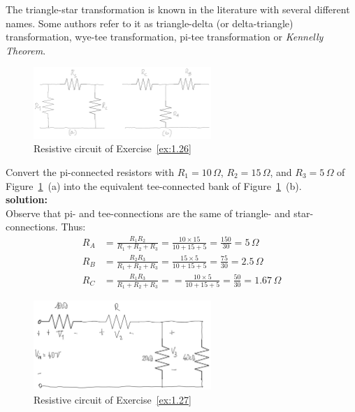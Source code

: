 \begin{remark}
The triangle-star transformation is known in the literature with several different names. Some authors refer to it as triangle-delta (or delta-triangle) transformation, wye-tee transformation, pi-tee transformation or \emph{Kennelly Theorem}.
\end{remark}

\begin{figure}[h!]
  \centering
  \includegraphics[width=0.6\textwidth]{"images/Fig-05"}
  \caption{Resistive circuit of Exercise~\ref{ex:1.26}} 
  \label{Fig:Ex:1.26}
\end{figure}

\begin{exercise}
\label{ex:1.26}
Convert the pi-connected resistors with $R_1=10\,\Omega$, $R_2=15\,\Omega$, and $R_3=5\,\Omega$ of Figure~\ref{Fig:Ex:1.26}~(a) into the equivalent tee-connected bank of Figure~\ref{Fig:Ex:1.26}~(b).\\

\textbf{solution:}\\ 
Observe that pi- and tee-connections are the same of triangle- and star-connections. Thus:
\begin{equation*}
\begin{split}
R_A &= \frac{R_1R_2}{R_1 + R_2 + R_3} = \frac{10\times 15}{10 + 15 + 5} =\frac{150}{30} =5\,\Omega\\
R_B &= \frac{R_2R_3}{R_1 + R_2 + R_3} = \frac{15\times 5}{10 + 15 + 5} =\frac{75}{30} =2.5\,\Omega\\
R_C &= \frac{R_1R_3}{R_1 + R_2 + R_3} = = \frac{10\times 5}{10 + 15 + 5} =\frac{50}{30} =1.67\,\Omega
\end{split}
\end{equation*}
\end{exercise}

\begin{figure}[h!]
  \centering
  \includegraphics[width=0.6\textwidth]{"images/Fig-06"}
  \caption{Resistive circuit of Exercise~\ref{ex:1.27}} 
  \label{Fig:Ex:1.27}
\end{figure}

